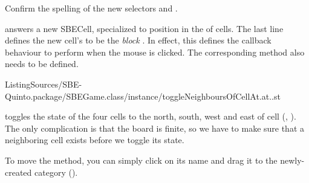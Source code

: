 \documentclass[a4paper,10pt,twoside]{book}
\begin{document}
Confirm the spelling of the new selectors  and .

 answers a new SBECell, specialized to position  in the  of cells.
The last line defines the new cell's  to be the \emph{block}
\mbox{.}
 In effect, this defines the callback behaviour to perform when the mouse is clicked.
The corresponding method also needs to be defined.

%
{ListingSources/SBE-Quinto.package/SBEGame.class/instance/toggleNeighboursOfCellAt.at..st}

 toggles the state of the four cells to the north, south, west and east of cell (, ).  The only complication is that the board is finite, so we have to make sure that a neighboring cell exists before we toggle its state.

To move the method, you can simply click on its name and drag it to the newly-created category ().
\end{document}
